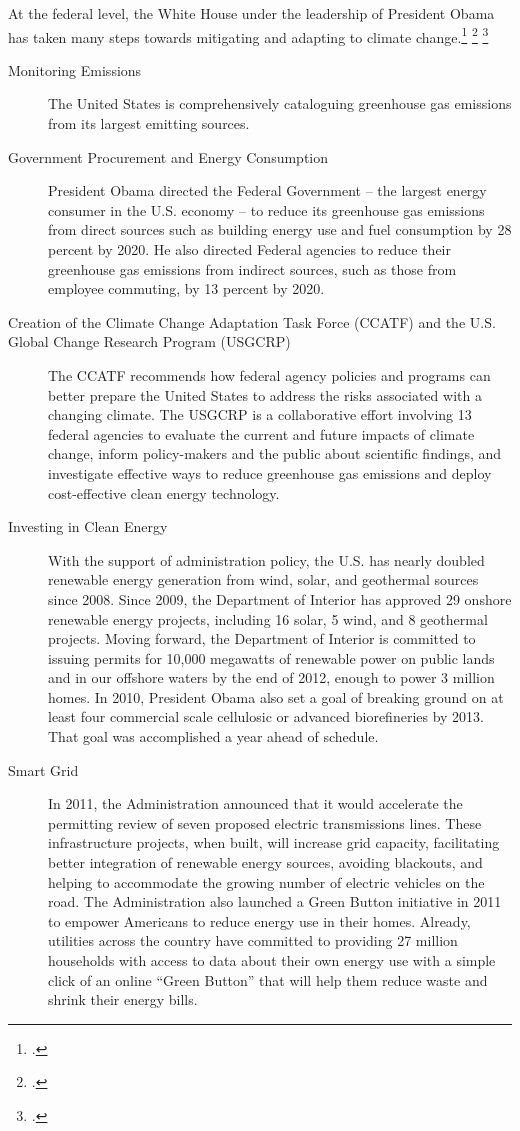At the federal level, the White House under the leadership of President Obama has taken many steps towards mitigating and adapting to climate change.\footcite[][]{WHcc2013} \footcite[][]{WHadaptation2013} \footcite[][]{WHenergy}
\begin{description}
	\item [Monitoring Emissions] The United States is comprehensively cataloguing greenhouse gas emissions from its largest emitting sources.
	\item [Government Procurement and Energy Consumption] President Obama directed the Federal Government – the largest energy consumer in the U.S. economy – to reduce its greenhouse gas emissions from direct sources such as building energy use and fuel consumption by 28 percent by 2020. He also directed Federal agencies to reduce their greenhouse gas emissions from indirect sources, such as those from employee commuting, by 13 percent by 2020.
	\item [Creation of the Climate Change Adaptation Task Force (CCATF) and the U.S. Global Change Research Program (USGCRP)] The CCATF recommends how federal agency policies and programs can better prepare the United States to address the risks associated with a changing climate. The USGCRP is a collaborative effort involving 13 federal agencies to evaluate the current and future impacts of climate change, inform policy-makers and the public about scientific findings, and investigate effective ways to reduce greenhouse gas emissions and deploy cost-effective clean energy technology.
	\item [Investing in Clean Energy] With the support of administration policy, the U.S. has nearly doubled renewable energy generation from wind, solar, and geothermal sources since 2008. Since 2009, the Department of Interior has approved 29 onshore renewable energy projects, including 16 solar, 5 wind, and 8 geothermal projects. Moving forward, the Department of Interior is committed to issuing permits for 10,000 megawatts of renewable power on public lands and in our offshore waters by the end of 2012, enough to power 3 million homes. In 2010, President Obama also set a goal of breaking ground on at least four commercial scale cellulosic or advanced biorefineries by 2013. That goal was accomplished a year ahead of schedule.
	\item [Smart Grid] In 2011, the Administration announced that it would accelerate the permitting review of seven proposed electric transmissions lines. These infrastructure projects, when built, will increase grid capacity, facilitating better integration of renewable energy sources, avoiding blackouts, and helping to accommodate the growing number of electric vehicles on the road. The Administration also launched a Green Button initiative in 2011 to empower Americans to reduce energy use in their homes. Already, utilities across the country have committed to providing 27 million households with access to data about their own energy use with a simple click of an online ``Green Button'' that will help them reduce waste and shrink their energy bills.

\end{description}
